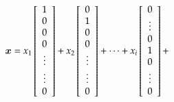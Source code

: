                     \begin{equation*}
                        \bx
                        =
                        x_{1}\left[
                            \begin{array}{c}
                                1 \\
                                0 \\
                                0 \\
                                0 \\
                                \vdots \\
                                \vdots \\
                                0 \\
                            \end{array}
                        \right]
                        +
                        x_{2}\left[
                            \begin{array}{c}
                                0 \\
                                1 \\
                                0 \\
                                0 \\
                                \vdots \\
                                \vdots \\
                                0 \\
                            \end{array}
                        \right]
                        +
                        \cdots
                        +
                        x_{i}\left[
                            \begin{array}{c}
                                0 \\
                                \vdots \\
                                0 \\
                                1 \\
                                0 \\
                                \vdots \\
                                0 \\
                            \end{array}
                        \right]
                        +

\end{equation*}

